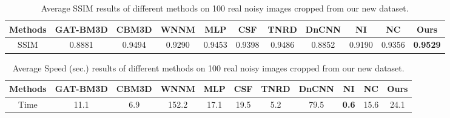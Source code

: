 \begin{table}[htpb]
\begin{adjustwidth}{-2cm}{}
\scriptsize
\caption{Average SSIM \cite{ssim} results of different methods on 100 real noisy images cropped from our new dataset.}
\label{tab3}
\begin{center}
\renewcommand\arraystretch{1}
\begin{tabular}{|c||c|c|c|c|c|c|c|c|c|c|}
\hline
Methods
&\textbf{GAT-BM3D}
&\textbf{CBM3D}
&\textbf{WNNM}
&\textbf{MLP}
&\textbf{CSF} 
&\textbf{TNRD} 
&\textbf{DnCNN}
&\textbf{NI} 
&\textbf{NC} 
&\textbf{Ours} 
\\
\hline
SSIM  
& 0.8881 & 0.9494 & 0.9290 & 0.9453 & 0.9398 & 0.9486 & 0.8852 & 0.9190 & 0.9356 & \textbf{0.9529}
\\
\hline
\end{tabular}
\end{center}
\end{adjustwidth}
\end{table}



\begin{table}\vspace{-4mm}
\begin{adjustwidth}{-2cm}{}
\scriptsize
\caption{Average Speed (sec.) results of different methods on 100 real noisy images cropped from our new dataset.}
\vspace{-4mm}
\label{tab5}
\begin{center}
\renewcommand\arraystretch{1}
\begin{tabular}{|c||c|c|c|c|c|c|c|c|c|c|}
\hline
Methods
&\textbf{GAT-BM3D}
&\textbf{CBM3D}
&\textbf{WNNM}
&\textbf{MLP}
&\textbf{CSF} 
&\textbf{TNRD} 
&\textbf{DnCNN}
&\textbf{NI} 
&\textbf{NC} 
&\textbf{Ours} 
\\
\hline
Time  
& 11.1 & 6.9 & 152.2 & 17.1 & 19.5 & 5.2 & 79.5 & \textbf{0.6} & 15.6 & 24.1
\\
\hline
\end{tabular}
\end{center}
\end{adjustwidth}
\end{table}


